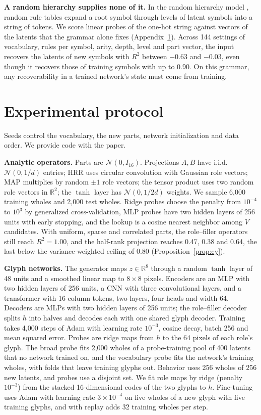 \documentclass[10pt]{article}
\theoremstyle{plain}
\theoremstyle{remark}
\newcommand{\R}{\mathbb{R}}
\begin{document}
\textbf{A random hierarchy supplies none of it.} In the random hierarchy model \citep{cagnetta2024rhm}, random rule tables expand a root symbol through levels of latent symbols into a string of tokens. We score linear probes of the one-hot string against vectors of the latents that the grammar alone fixes (Appendix~\ref{app:protocol}). Across 144 settings of vocabulary, rules per symbol, arity, depth, level and part vector, the input recovers the latents of new symbols with $R^2$ between $-0.63$ and $-0.03$, even though it recovers those of training symbols with up to 0.90. On this grammar, any recoverability in a trained network's state must come from training.

\section{Experimental protocol}
\label{app:protocol}

Seeds control the vocabulary, the new parts, network initialization and data order. We provide code with the paper.

\textbf{Analytic operators.} Parts are $\mathcal{N}(0, I_{16})$. Projections $A, B$ have i.i.d.\ $\mathcal{N}(0, 1/d)$ entries; HRR uses circular convolution with Gaussian role vectors; MAP multiplies by random $\pm 1$ role vectors; the tensor product uses two random role vectors in $\R^2$; the $\tanh$ layer has $\mathcal{N}(0, 1/2d)$ weights. We sample 6{,}000 training wholes and 2{,}000 test wholes. Ridge probes choose the penalty from $10^{-4}$ to $10^{3}$ by generalized cross-validation, MLP probes have two hidden layers of 256 units with early stopping, and the lookup is a cosine nearest neighbor among $V$ candidates. With uniform, sparse and correlated parts, the role--filler operators still reach $R^2 = 1.00$, and the half-rank projection reaches 0.47, 0.38 and 0.64, the last below the variance-weighted ceiling of 0.80 (Proposition~\ref{prop:ey}).

\textbf{Glyph networks.} The generator maps $z \in \R^8$ through a random $\tanh$ layer of 48 units and a smoothed linear map to $8 \times 8$ pixels. Encoders are an MLP with two hidden layers of 256 units, a CNN with three convolutional layers, and a transformer with 16 column tokens, two layers, four heads and width 64. Decoders are MLPs with two hidden layers of 256 units; the role--filler decoder splits $h$ into halves and decodes each with one shared glyph decoder. Training takes 4{,}000 steps of Adam with learning rate $10^{-3}$, cosine decay, batch 256 and mean squared error. Probes are ridge maps from $h$ to the 64 pixels of each role's glyph. The broad probe fits 2{,}000 wholes of a probe-training pool of 400 latents that no network trained on, and the vocabulary probe fits the network's training wholes, with folds that leave training glyphs out. Behavior uses 256 wholes of 256 new latents, and probes use a disjoint set. We fit role maps by ridge (penalty $10^{-3}$) from the stacked 16-dimensional codes of the two glyphs to $h$. Fine-tuning uses Adam with learning rate $3 \times 10^{-4}$ on five wholes of a new glyph with five training glyphs, and with replay adds 32 training wholes per step.
\end{document}
